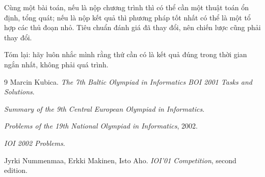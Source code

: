 \documentclass[11pt]{article}
\begin{document}
Cùng một bài toán, nếu là nộp chương trình thì có thể cần một thuật toán ổn
định, tổng quát; nếu là nộp kết quả thì phương pháp tốt nhất có thể là một
tổ hợp các thủ đoạn nhỏ. Tiêu chuẩn đánh giá đã thay đổi, nên chiến lược cũng
phải thay đổi.

Tóm lại: hãy luôn nhắc mình rằng thứ cần có là kết quả đúng trong thời gian
ngắn nhất, không phải quá trình.

\begin{thebibliography}{9}
Marcin Kubica.
\textit{The 7th Baltic Olympiad in Informatics BOI 2001 Tasks and Solutions}.

\textit{Summary of the 9th Central European Olympiad in Informatics}.

\textit{Problems of the 19th National Olympiad in Informatics}, 2002.

\textit{IOI 2002 Problems}.

Jyrki Nummenmaa, Erkki Makinen, Isto Aho.
\textit{IOI'01 Competition}, second edition.
\end{thebibliography}
\end{document}
